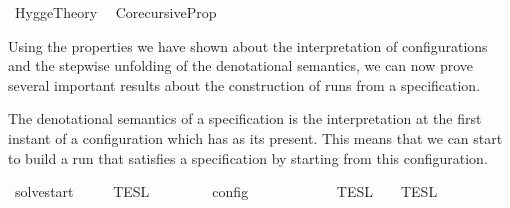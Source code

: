 %
\begin{isabellebody}%
%
%
\isadelimdocument
%
\endisadelimdocument
%
\isatagdocument
%
\isamarkuptrue%
%
\endisatagdocument
{\isafolddocument}%
%
\isadelimdocument
%
\endisadelimdocument
%
\isadelimtheory
%
\endisadelimtheory
%
\isatagtheory
{}\isamarkupfalse%
\ Hygge{\isacharunderscore}Theory\isanewline
{}\isanewline
\ \ Corecursive{\isacharunderscore}Prop\isanewline
\isanewline
{}%
\endisatagtheory
{\isafoldtheory}%
%
\isadelimtheory
%
\endisadelimtheory
%
\begin{isamarkuptext}%
Using the properties we have shown about the interpretation of configurations 
  and the stepwise unfolding of the denotational semantics, we can now prove 
  several important results about the construction of runs from a specification.%
\end{isamarkuptext}\isamarkuptrue%
%
\isadelimdocument
%
\endisadelimdocument
%
\isatagdocument
%
\isamarkuptrue%
%
\endisatagdocument
{\isafolddocument}%
%
\isadelimdocument
%
\endisadelimdocument
%
\begin{isamarkuptext}%
The denotational semantics of a specification \isa{{\isasymPsi}} is the interpretation 
  at the first instant of a configuration which has \isa{{\isasymPsi}} as its present.
  This means that we can start to build a run that satisfies a specification by 
  starting from this configuration.%
\end{isamarkuptext}\isamarkuptrue%
\isamarkupfalse%
\ solve{\isacharunderscore}start{\isacharcolon}\isanewline
\ \ \ {\isacartoucheopen}{\isasymlbrakk}{\isasymlbrakk}\ {\isasymPsi}\ {\isasymrbrakk}{\isasymrbrakk}\isactrlsub T\isactrlsub E\isactrlsub S\isactrlsub L\ {\isacharequal}\ {\isasymlbrakk}\ {\isacharbrackleft}{\isacharbrackright}{\isacharcomma}\ {}\ {\isasymturnstile}\ {\isasymPsi}\ {\isasymtriangleright}\ {\isacharbrackleft}{\isacharbrackright}\ {\isasymrbrakk}\isactrlsub c\isactrlsub o\isactrlsub n\isactrlsub f\isactrlsub i\isactrlsub g{\isacartoucheclose}\isanewline
%
\isadelimproof
\ \ %
\endisadelimproof
%
\isatagproof
{}\isamarkupfalse%
\ {\isacharminus}\isanewline
\ \ \ \ \isamarkupfalse%
\ {\isacartoucheopen}{\isasymlbrakk}{\isasymlbrakk}\ {\isasymPsi}\ {\isasymrbrakk}{\isasymrbrakk}\isactrlsub T\isactrlsub E\isactrlsub S\isactrlsub L\ {\isacharequal}\ {\isasymlbrakk}{\isasymlbrakk}\ {\isasymPsi}\ {\isasymrbrakk}{\isasymrbrakk}\isactrlsub T\isactrlsub E\isactrlsub S\isactrlsub L\isactrlbsup {\isasymge}\ {}\isactrlesup {\isacartoucheclose}\isanewline

\end{isabellebody}
